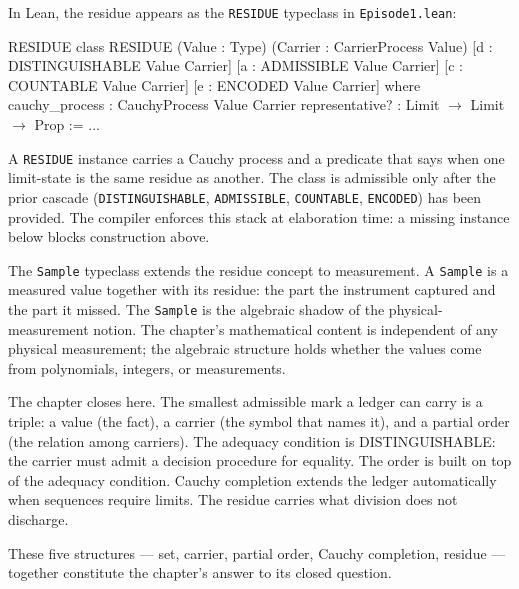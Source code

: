 In Lean, the residue appears as the \texttt{RESIDUE} typeclass in
\texttt{Episode1.lean}:

\begin{leanexcerpt}{RESIDUE}
class RESIDUE
    (Value : Type)
    (Carrier : CarrierProcess Value)
    [d : DISTINGUISHABLE Value Carrier]
    [a : ADMISSIBLE Value Carrier]
    [c : COUNTABLE Value Carrier]
    [e : ENCODED Value Carrier]
  where
  cauchy_process : CauchyProcess Value Carrier
  representative? : Limit $\to$ Limit $\to$ Prop := ...
\end{leanexcerpt}

A \texttt{RESIDUE} instance carries a Cauchy process and a
predicate that says when one limit-state is the same residue as
another. The class is admissible only after the prior cascade
(\texttt{DISTINGUISHABLE}, \texttt{ADMISSIBLE}, \texttt{COUNTABLE},
\texttt{ENCODED}) has been provided. The compiler enforces this
stack at elaboration time: a missing instance below blocks
construction above.

The \texttt{Sample} typeclass extends the residue concept to
measurement. A \texttt{Sample} is a measured value together with
its residue: the part the instrument captured and the part it
missed. The \texttt{Sample} is the algebraic shadow of the
physical-measurement notion. The chapter's mathematical content
is independent of any physical measurement; the algebraic structure
holds whether the values come from polynomials, integers, or
measurements.

The chapter closes here. The smallest admissible mark a ledger can
carry is a triple: a value (the fact), a carrier (the symbol that
names it), and a partial order (the relation among carriers). The
adequacy condition is DISTINGUISHABLE: the carrier must admit a
decision procedure for equality. The order is built on top of the
adequacy condition. Cauchy completion extends the ledger
automatically when sequences require limits. The residue carries
what division does not discharge.

These five structures --- set, carrier, partial order, Cauchy
completion, residue --- together constitute the chapter's answer
to its closed question.

